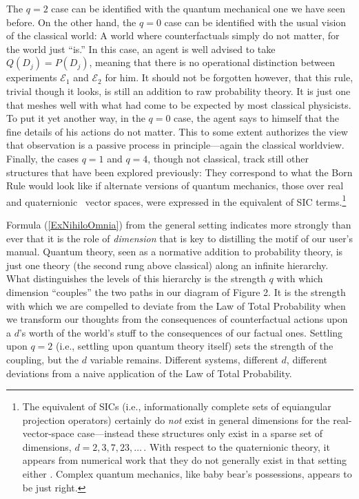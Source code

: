 The $q=2$ case can be identified with the quantum me\-chanical one we have seen before.  On the other hand, the $q=0$ case can be identified with the usual vision of the classical world:  A world where counterfactuals simply do not matter, for the world just ``is.''  In this case, an agent is well advised to take $Q(D_j)=P(D_j)$, meaning that there is no operational distinction between experiments ${\mathcal E}_1$ and ${\mathcal E}_2$ for him. It should not be forgotten however, that this rule, trivial though it looks, is still an addition to raw probability theory.  It is just one that meshes well with what had come to be expected by most classical physicists.  To put it yet another way, in the $q=0$ case, the agent says to himself that the fine details of his actions do not matter. This to some extent authorizes the view that observation is a passive process in principle---again the classical worldview.  Finally, the cases $q=1$ and $q=4$, though not classical, track still other structures that have been explored previously:  They correspond to what the Born Rule would look like if alternate versions of quantum mechanics, those over real~\cite{Stueckelberg60} and quaternionic~\cite{AdlerBook} vector spaces, were expressed in the equivalent of SIC terms.\footnote{The equivalent of SICs (i.e., informationally complete sets of equiangular projection operators) certainly do {\it not\/} exist in general dimensions for the real-vector-space case---instead these structures only exist in a sparse set of dimensions, $d=2,3,7,23,\ldots\,$. With respect to the quaternionic theory, it appears from numerical work that they do not generally exist in that setting either \cite{Khatirinejad08}.  Complex quantum mechanics, like baby bear's possessions, appears to be just right.}

Formula (\ref{ExNihiloOmnia}) from the general setting indicates more strongly than ever that it is the role of {\it dimension\/} that is key to distilling the motif of our user's manual.  Quantum theory, seen as a normative addition to probability theory, is just one theory (the second rung above classical) along an infinite hierarchy.  What distinguishes the levels of this hierarchy is the strength $q$ with which dimension ``couples'' the two paths in our diagram of Figure 2.  It is the strength with which we are compelled to deviate from the Law of Total Probability when we transform our thoughts from the consequences of counterfactual actions upon a $d$'s worth of the world's stuff to the consequences of our factual ones.  Settling upon $q=2$ (i.e., settling upon quantum theory itself) sets the strength of the coupling, but the $d$ variable remains.  Different systems, different $d$, different deviations from a naive application of the Law of Total Probability.

